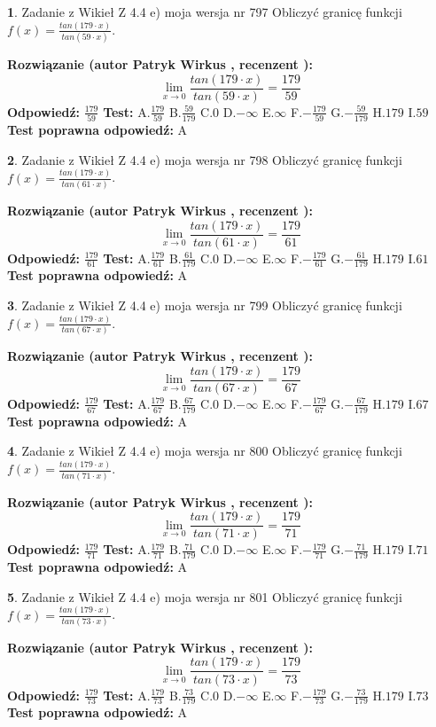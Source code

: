 \documentclass[12pt, a4paper]{article}
\theoremstyle{definition} %
\newtheorem{zad}{}
\newcommand{\zadStart}[1]{\begin{zad}#1\newline}
\newcommand{\zadStop}{\end{zad}}
\newcommand{\rozwStart}[2]{\noindent \textbf{Rozwiązanie (autor #1 , recenzent #2): }\newline}
\newcommand{\rozwStop}{\newline}
\newcommand{\odpStart}{\noindent \textbf{Odpowiedź:}\newline}
\newcommand{\odpStop}{\newline}
\newcommand{\testStart}{\noindent \textbf{Test:}\newline}
\newcommand{\testStop}{\newline}
\newcommand{\kluczStart}{\noindent \textbf{Test poprawna odpowiedź:}\newline}
\newcommand{\kluczStop}{\newline}
\begin{document}
\zadStart{Zadanie z Wikieł Z 4.4 e) moja wersja nr 797}
Obliczyć granicę funkcji $f(x)=\frac{tan(179\cdot x)}{tan(59\cdot x)}$.
\zadStop
\rozwStart{Patryk Wirkus}{}
$$\lim\limits_{x\to 0}\frac{tan(179\cdot x)}{tan(59\cdot x)}=
\frac{179}{59}$$
\rozwStop
\odpStart
$\frac{179}{59}$
\odpStop
\testStart
A.$\frac{179}{59}$
B.$\frac{59}{179}$
C.$0$
D.$-\infty$
E.$\infty$
F.$-\frac{179}{59}$
G.$-\frac{59}{179}$
H.$179$
I.$59$
\testStop
\kluczStart
A
\kluczStop



\zadStart{Zadanie z Wikieł Z 4.4 e) moja wersja nr 798}
Obliczyć granicę funkcji $f(x)=\frac{tan(179\cdot x)}{tan(61\cdot x)}$.
\zadStop
\rozwStart{Patryk Wirkus}{}
$$\lim\limits_{x\to 0}\frac{tan(179\cdot x)}{tan(61\cdot x)}=
\frac{179}{61}$$
\rozwStop
\odpStart
$\frac{179}{61}$
\odpStop
\testStart
A.$\frac{179}{61}$
B.$\frac{61}{179}$
C.$0$
D.$-\infty$
E.$\infty$
F.$-\frac{179}{61}$
G.$-\frac{61}{179}$
H.$179$
I.$61$
\testStop
\kluczStart
A
\kluczStop



\zadStart{Zadanie z Wikieł Z 4.4 e) moja wersja nr 799}
Obliczyć granicę funkcji $f(x)=\frac{tan(179\cdot x)}{tan(67\cdot x)}$.
\zadStop
\rozwStart{Patryk Wirkus}{}
$$\lim\limits_{x\to 0}\frac{tan(179\cdot x)}{tan(67\cdot x)}=
\frac{179}{67}$$
\rozwStop
\odpStart
$\frac{179}{67}$
\odpStop
\testStart
A.$\frac{179}{67}$
B.$\frac{67}{179}$
C.$0$
D.$-\infty$
E.$\infty$
F.$-\frac{179}{67}$
G.$-\frac{67}{179}$
H.$179$
I.$67$
\testStop
\kluczStart
A
\kluczStop



\zadStart{Zadanie z Wikieł Z 4.4 e) moja wersja nr 800}
Obliczyć granicę funkcji $f(x)=\frac{tan(179\cdot x)}{tan(71\cdot x)}$.
\zadStop
\rozwStart{Patryk Wirkus}{}
$$\lim\limits_{x\to 0}\frac{tan(179\cdot x)}{tan(71\cdot x)}=
\frac{179}{71}$$
\rozwStop
\odpStart
$\frac{179}{71}$
\odpStop
\testStart
A.$\frac{179}{71}$
B.$\frac{71}{179}$
C.$0$
D.$-\infty$
E.$\infty$
F.$-\frac{179}{71}$
G.$-\frac{71}{179}$
H.$179$
I.$71$
\testStop
\kluczStart
A
\kluczStop



\zadStart{Zadanie z Wikieł Z 4.4 e) moja wersja nr 801}
Obliczyć granicę funkcji $f(x)=\frac{tan(179\cdot x)}{tan(73\cdot x)}$.
\zadStop
\rozwStart{Patryk Wirkus}{}
$$\lim\limits_{x\to 0}\frac{tan(179\cdot x)}{tan(73\cdot x)}=
\frac{179}{73}$$
\rozwStop
\odpStart
$\frac{179}{73}$
\odpStop
\testStart
A.$\frac{179}{73}$
B.$\frac{73}{179}$
C.$0$
D.$-\infty$
E.$\infty$
F.$-\frac{179}{73}$
G.$-\frac{73}{179}$
H.$179$
I.$73$
\testStop
\kluczStart
A
\kluczStop
\end{document}
